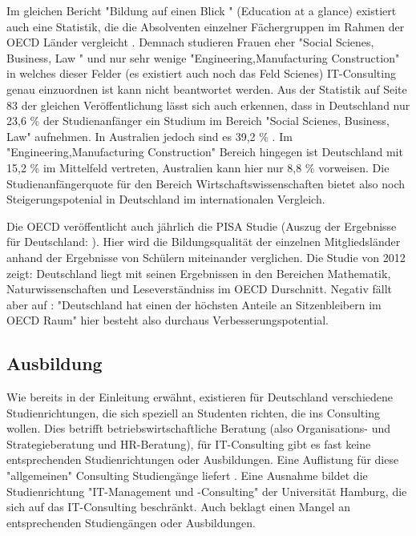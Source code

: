 Im gleichen Bericht "Bildung auf einen Blick " (Education at a glance) existiert auch eine Statistik, die die Absolventen einzelner Fächergruppen im Rahmen der OECD Länder vergleicht \cite{oecd3}. Demnach studieren Frauen eher "Social Scienes, Business, Law " und nur sehr wenige "Engineering,Manufacturing Construction" in welches dieser Felder (es existiert auch noch das Feld Scienes) IT-Consulting genau einzuordnen ist kann nicht beantwortet werden. Aus der Statistik auf Seite 83 der gleichen Veröffentlichung lässt sich auch erkennen, dass in Deutschland nur 23,6 \% der Studienanfänger ein Studium im Bereich "Social Scienes, Business, Law" aufnehmen. In Australien jedoch sind es 39,2 \% . Im "Engineering,Manufacturing Construction" Bereich hingegen ist Deutschland mit 15,2 \% im Mittelfeld vertreten, Australien kann hier nur  8,8 \% vorweisen. Die Studienanfängerquote für den Bereich Wirtschaftswissenschaften bietet also noch Steigerungspotenial in Deutschland im internationalen Vergleich.

Die OECD veröffentlicht auch jährlich die PISA Studie (Auszug der Ergebnisse für Deutschland: \cite{pisa} ). Hier wird die Bildungsqualität der einzelnen Mitgliedsländer anhand der Ergebnisse von Schülern miteinander verglichen. Die Studie von 2012 zeigt: Deutschland liegt mit seinen Ergebnissen in den Bereichen Mathematik, Naturwissenschaften und Leseverständniss im OECD Durschnitt. Negativ fällt aber auf : "Deutschland hat einen der höchsten Anteile an Sitzenbleibern im OECD Raum" hier besteht also durchaus Verbesserungspotential.

\subsection{Ausbildung}
Wie bereits in der Einleitung erwähnt, existieren für Deutschland verschiedene Studienrichtungen, die sich speziell an Studenten richten, die ins Consulting wollen. Dies betrifft betriebswirtschaftliche Beratung (also Organisations- und Strategieberatung und HR-Beratung), für IT-Consulting gibt es fast keine entsprechenden Studienrichtungen oder Ausbildungen.
Eine Auflistung für diese "allgemeinen" Consulting Studiengänge liefert \cite{NissenKlaukDeelmannMohe201209}. 
Eine Ausnahme bildet die Studienrichtung "IT-Management und -Consulting" der Universität Hamburg, die sich auf das IT-Consulting beschränkt. Auch \cite{IDSScheer} beklagt einen Mangel an entsprechenden Studiengängen oder Ausbildungen.

